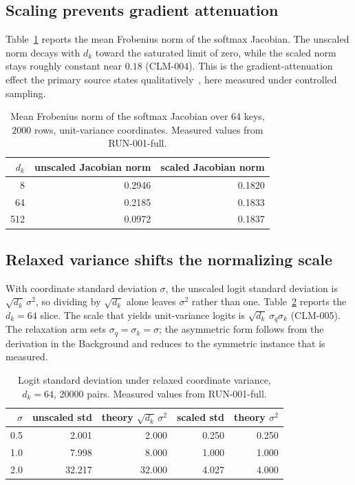 \documentclass{article}
\begin{document}
\subsection{Scaling prevents gradient attenuation}

Table~\ref{tab:gradient} reports the mean Frobenius norm of the softmax
Jacobian. The unscaled norm decays with $d_k$ toward the saturated limit of
zero, while the scaled norm stays roughly constant near $0.18$ (CLM-004). This
is the gradient-attenuation effect the primary source states
qualitatively~\citep{vaswani2017attention}, here measured under controlled
sampling.

\begin{table}[h]
\centering
\caption{Mean Frobenius norm of the softmax Jacobian over $64$ keys, $2000$
rows, unit-variance coordinates. Measured values from RUN-001-full.}
\label{tab:gradient}
\begin{tabular}{r r r}
\toprule
$d_k$ & unscaled Jacobian norm & scaled Jacobian norm \\
\midrule
8 & 0.2946 & 0.1820 \\
64 & 0.2185 & 0.1833 \\
512 & 0.0972 & 0.1837 \\
\bottomrule
\end{tabular}
\end{table}

\subsection{Relaxed variance shifts the normalizing scale}

With coordinate standard deviation $\sigma$, the unscaled logit standard
deviation is $\sqrt{d_k}\,\sigma^2$, so dividing by $\sqrt{d_k}$ alone leaves
$\sigma^2$ rather than one. Table~\ref{tab:relaxation} reports the $d_k = 64$
slice. The scale that yields unit-variance logits is
$\sqrt{d_k}\,\sigma_q\sigma_k$ (CLM-005). The relaxation arm sets
$\sigma_q = \sigma_k = \sigma$; the asymmetric form follows from the
derivation in the Background and reduces to the symmetric instance that is
measured.

\begin{table}[h]
\centering
\caption{Logit standard deviation under relaxed coordinate variance, $d_k=64$,
$20000$ pairs. Measured values from RUN-001-full.}
\label{tab:relaxation}
\begin{tabular}{r r r r r}
\toprule
$\sigma$ & unscaled std & theory $\sqrt{d_k}\,\sigma^2$ & scaled std & theory $\sigma^2$ \\
\midrule
0.5 & 2.001 & 2.000 & 0.250 & 0.250 \\
1.0 & 7.998 & 8.000 & 1.000 & 1.000 \\
2.0 & 32.217 & 32.000 & 4.027 & 4.000 \\
\bottomrule
\end{tabular}
\end{table}
\end{document}

